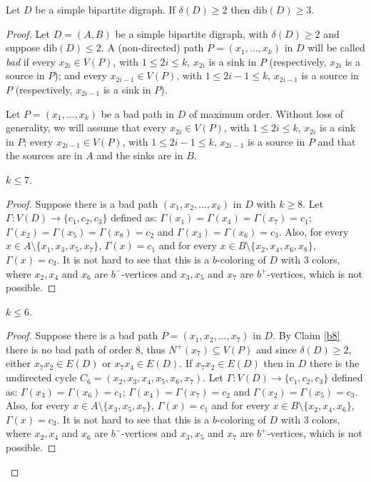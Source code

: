 \documentclass[10pt,a4paper]{amsart}
\begin{document}
\begin{theorem}\label{d=3} Let $D$ be a simple bipartite  digraph.  If $\delta(D)\geq 2$ then $\text{dib}(D)\geq 3$.     
\end{theorem} 

\begin{proof} Let $D=(A,B)$ be a simple bipartite  digraph, with $\delta(D)\geq 2$ and suppose  $\text{dib}(D)\leq 2$. 
A (non-directed) path $P = (x_1, \dots, x_k)$ in $D$ will be called \emph{bad} if every $x_{2i}\in V(P)$, with $1\leq 2i\leq k$, $x_{2i}$ is a sink in $P$ (respectively, $x_{2i}$ is a source in $P$); and every $x_{2i-1}\in V(P)$, with $1\leq 2i-1\leq k$, $x_{2i-1}$ is a source in $P$ (respectively, $x_{2i-1}$ is a sink in $P$).




Let $P=(x_1, \dots, x_k)$ be a bad path in $D$ of maximum order. Without loss of generality, we will assume that every $x_{2i}\in V(P)$, with $1\leq 2i\leq k$, $x_{2i}$ is a sink in $P$; every $x_{2i-1}\in V(P)$, with $1\leq 2i-1\leq k$, $x_{2i-1}$ is a source in $P$ and that  the sources are in $A$ and the sinks are in $B$.


\begin{claim}\label{b8} $k\leq 7$.
\end{claim}
\begin{proof} Suppose there is a bad path $(x_1, x_2, \dots, x_k)$ in $D$ with $k\geq 8$.   Let $\Gamma: V(D) \rightarrow \{c_1, c_2, c_3\}$ defined as: $\Gamma(x_1) = \Gamma(x_4) = \Gamma(x_7) = c_1$; $\Gamma(x_2) = \Gamma(x_5) = \Gamma(x_8)= c_2$ and $\Gamma(x_3) = \Gamma(x_6) = c_3$. Also, for every $x\in A\setminus\{x_1, x_3, x_5, x_7\}$, $\Gamma(x) = c_1$ and for every $x\in B\setminus\{x_2, x_4, x_6, x_8\}$, $\Gamma(x) = c_3$. It is not hard to see that this is a $b$-coloring of $D$ with 3 colors, where $x_2, x_4$ and $x_6$ are $b^-$-vertices and $x_3, x_5$ and $x_7$ are $b^+$-vertices,  which is not possible. 
\end{proof}


\begin{claim}\label{b7} $k\leq 6$.
\end{claim}
\begin{proof} Suppose there is a bad path $P=(x_1, x_2, \dots, x_7)$ in $D$. By Claim \ref{b8} there is no bad path of order $8$, thus $N^+(x_7) \subseteq V(P)$ and since $\delta(D) \geq 2$,  either $x_7x_2\in E(D)$ or $x_7x_4\in E(D)$. If $x_7x_2\in E(D)$ then in $D$ there is the undirected cycle $C_6= (x_2, x_3, x_4, x_5, x_6, x_7)$.  Let $\Gamma: V(D) \rightarrow \{c_1, c_2, c_3\}$ defined as: $\Gamma(x_3) = \Gamma(x_6) = c_1$; $\Gamma(x_4) = \Gamma(x_7) = c_2$ and $\Gamma(x_2) = \Gamma(x_5) = c_3$. Also, for every $x\in A\setminus\{x_3, x_5, x_7\}$, $\Gamma(x) = c_1$ and for every $x\in B\setminus\{x_2, x_4, x_6\}$, $\Gamma(x) = c_3$. It is not hard to see that this is a $b$-coloring of $D$ with 3 colors, where $x_2, x_4$ and $x_6$ are $b^-$-vertices and $x_3, x_5$ and $x_7$ are $b^+$-vertices, which is not possible. 


\end{proof}
\end{proof}
\end{document}
